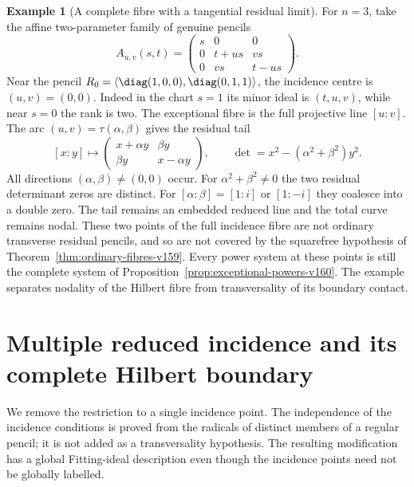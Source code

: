 \documentclass[11pt,reqno]{amsart}
\numberwithin{equation}{section}
\theoremstyle{definition}\newtheorem{definition}[theorem]{Definition}
\newtheorem{example}[theorem]{Example}
\theoremstyle{remark}\newtheorem{remark}[theorem]{Remark}
\begin{document}
\begin{example}[A complete fibre with a tangential residual limit]
\label{ex:tangent-limit-v160}
For $n=3$, take the affine two-parameter family of genuine pencils
\[
 A_{u,v}(s,t)=
 \begin{pmatrix}s&0&0\\0&t+us&vs\\0&vs&t-us\end{pmatrix}.
\]
Near the pencil $R_0=\langle\diag(1,0,0),\diag(0,1,1)\rangle$,
the incidence centre is $(u,v)=(0,0)$. Indeed in the chart $s=1$
its minor ideal is $(t,u,v)$, while near $s=0$ the rank is two.
The exceptional fibre is the full projective line $[u:v]$.
The arc $(u,v)=\tau(\alpha,\beta)$ gives the residual tail
\[
 [x:y]\longmapsto
 \begin{pmatrix}x+\alpha y&\beta y\\
                 \beta y&x-\alpha y\end{pmatrix},
 \qquad \det=x^2-(\alpha^2+\beta^2)y^2.
\]
All directions $(\alpha,\beta)\ne(0,0)$ occur. For
$\alpha^2+\beta^2\ne0$ the two residual determinant zeros are distinct.
For $[\alpha:\beta]=[1:i]$ or $[1:-i]$ they coalesce into a double
zero. The tail remains an embedded reduced line and the total curve
remains nodal. These two points of the full incidence fibre are not
ordinary transverse residual pencils, and so are not covered by the
squarefree hypothesis of Theorem~\ref{thm:ordinary-fibres-v159}.
Every power system at these points is still the complete system of
Proposition~\ref{prop:exceptional-powers-v160}. The example separates
nodality of the Hilbert fibre from transversality of its boundary
contact.
\end{example}

\section{Multiple reduced incidence and its complete Hilbert boundary}
\label{sec:multiple-incidence-v161}
We remove the restriction to a single incidence point. The independence
of the incidence conditions is proved from the radicals of distinct
members of a regular pencil; it is not added as a transversality
hypothesis. The resulting modification has a global Fitting-ideal
description even though the incidence points need not be globally
labelled.
\end{document}
